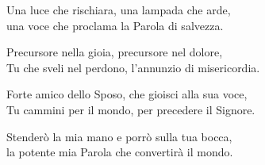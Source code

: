 
\strofa Una luce che rischiara, una lampada che arde,\\
una voce che proclama la Parola di salvezza.

\spazio

\strofa Precursore nella gioia, precursore nel dolore,\\
Tu che sveli nel perdono, l'annunzio di misericordia.

\spazio


\spazio

\strofa Forte amico dello Sposo, che gioisci alla sua voce,\\
Tu cammini per il mondo, per precedere il Signore.

\spazio

\strofa Stenderò la mia mano e porrò sulla tua bocca,\\
la potente mia Parola che convertirà il mondo.

\spazio

